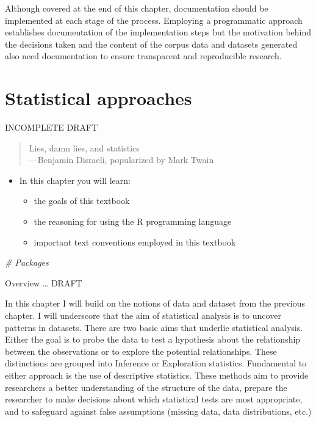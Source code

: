 \documentclass[
]{article}
\newenvironment{Shaded}{\begin{snugshade}}{\end{snugshade}}
\newcommand{\CommentTok}[1]{\textcolor[rgb]{0.56,0.35,0.01}{\textit{#1}}}
\providecommand{\tightlist}{%
  \setlength{\itemsep}{0pt}\setlength{\parskip}{0pt}}
\newenvironment{rmdblock}[1]
  {\begin{shaded*}
  \begin{itemize}
  \renewcommand{\labelitemi}{
    \raisebox{-.5\height}[0pt][0pt]{
      {\setkeys{Gin}{width=2em,keepaspectratio}\texttt{[image: assets/images/\#1]}}
    }
  }
  \item
  }
  {
  \end{itemize}
  \end{shaded*}
  }
\newenvironment{rmdkey}
  {\begin{rmdblock}{key}}
  {\end{rmdblock}}
\begin{document}
Although covered at the end of this chapter, documentation should be implemented at each stage of the process. Employing a programmatic approach establishes documentation of the implementation steps but the motivation behind the decisions taken and the content of the corpus data and datasets generated also need documentation to ensure transparent and reproducible research.

\hypertarget{statistical-approaches}{%
\section{Statistical approaches}\label{statistical-approaches}}

INCOMPLETE DRAFT

\begin{quote}
Lies, damn lies, and statistics\\
---Benjamin Disraeli, popularized by Mark Twain
\end{quote}

\begin{rmdkey}
In this chapter you will learn:

\begin{itemize}
\tightlist
\item
  the goals of this textbook
\item
  the reasoning for using the R programming language
\item
  important text conventions employed in this textbook
\end{itemize}
\end{rmdkey}

\begin{Shaded}
\begin{Highlighting}[]
\CommentTok{\# Packages}
\end{Highlighting}
\end{Shaded}

Overview \ldots{} DRAFT

In this chapter I will build on the notions of data and dataset from the previous chapter. I will underscore that the aim of statistical analysis is to uncover patterns in datasets. There are two basic aims that underlie statistical analysis. Either the goal is to probe the data to test a hypothesis about the relationship between the observations or to explore the potential relationships. These distinctions are grouped into Inference or Exploration statistics. Fundamental to either approach is the use of descriptive statistics. These methods aim to provide researchers a better understanding of the structure of the data, prepare the researcher to make decisions about which statistical tests are most appropriate, and to safeguard against false assumptions (missing data, data distributions, etc.)
\end{document}
